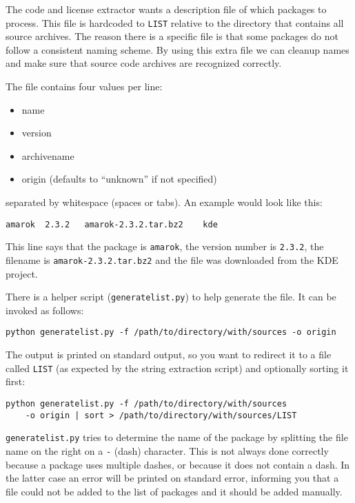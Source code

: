 \documentclass[10pt]{article}
\begin{document}
The code and license extractor wants a description file of which packages to
process. This file is hardcoded to \texttt{LIST} relative to the directory that
contains all source archives. The reason there is a specific file is that some
packages do not follow a consistent naming scheme. By using this extra file we
can cleanup names and make sure that source code archives are recognized
correctly.

The file contains four values per line:

\begin{itemize}
\item name
\item version
\item archivename
\item origin (defaults to ``unknown'' if not specified)
\end{itemize}

separated by whitespace (spaces or tabs). An example would look like this:

\begin{verbatim}
amarok	2.3.2	amarok-2.3.2.tar.bz2	kde
\end{verbatim}

This line says that the package is \texttt{amarok}, the version number is
\texttt{2.3.2}, the filename is \texttt{amarok-2.3.2.tar.bz2} and the file
was downloaded from the KDE project.

There is a helper script (\texttt{generatelist.py}) to help generate the file.
It can be invoked as follows:

\begin{verbatim}
python generatelist.py -f /path/to/directory/with/sources -o origin
\end{verbatim}

The output is printed on standard output, so you want to redirect it to a file
called \texttt{LIST} (as expected by the string extraction script) and
optionally sorting it first:

\begin{verbatim}
python generatelist.py -f /path/to/directory/with/sources
    -o origin | sort > /path/to/directory/with/sources/LIST
\end{verbatim}

\texttt{generatelist.py} tries to determine the name of the package by
splitting the file name on the right on a \texttt{-} (dash)
character. This is not always done correctly because a package uses multiple
dashes, or because it does not contain a dash. In the latter case an error
will be printed on standard error, informing you that a file could not be
added to the list of packages and it should be added manually.
\end{document}
